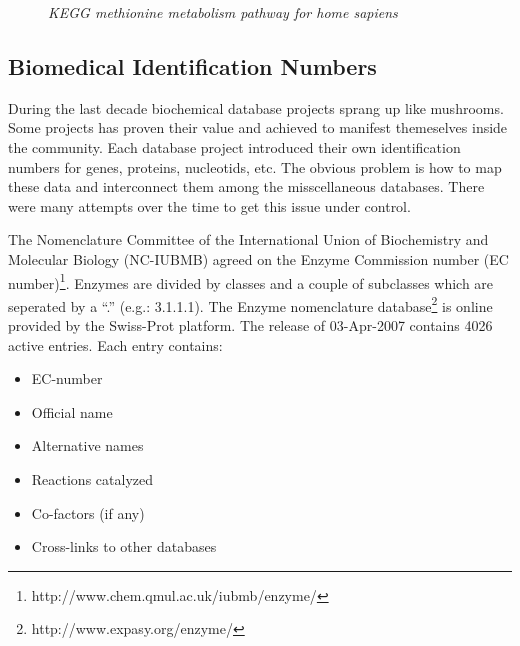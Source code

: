 \begin{figure}[ht]
\centering
{} 
\caption[KEGG methionine metabolism pathway for home sapiens]{\textit{KEGG methionine metabolism pathway for home sapiens}} 
\label{gfx:KEGG_methionine_metabolism_271_pathway_hsa}
\end{figure}

\subsection{Biomedical Identification Numbers}

During the last decade biochemical database projects sprang up like mushrooms. Some projects has proven their value and achieved to manifest themeselves inside the community. Each database project introduced their own identification numbers for genes, proteins, nucleotids, etc. The obvious problem is how to map these data and interconnect them among the misscellaneous databases. 
There were many attempts over the time to get this issue under control.

The Nomenclature Committee of the International Union of Biochemistry and Molecular Biology (NC-IUBMB) agreed on the Enzyme Commission number (EC number)\footnote{http://www.chem.qmul.ac.uk/iubmb/enzyme/}\citep{Bairoch2000}. Enzymes are divided by classes and a couple of subclasses which are seperated by a ``.'' (e.g.: 3.1.1.1). The Enzyme nomenclature database\footnote{http://www.expasy.org/enzyme/} is online provided by the Swiss-Prot platform.
The release of 03-Apr-2007 contains 4026 active entries. 
Each entry contains:
\begin{itemize}
 \item EC-number
 \item Official name
 \item Alternative names
 \item Reactions catalyzed
 \item Co-factors (if any)
 \item Cross-links to other databases
\end{itemize}

